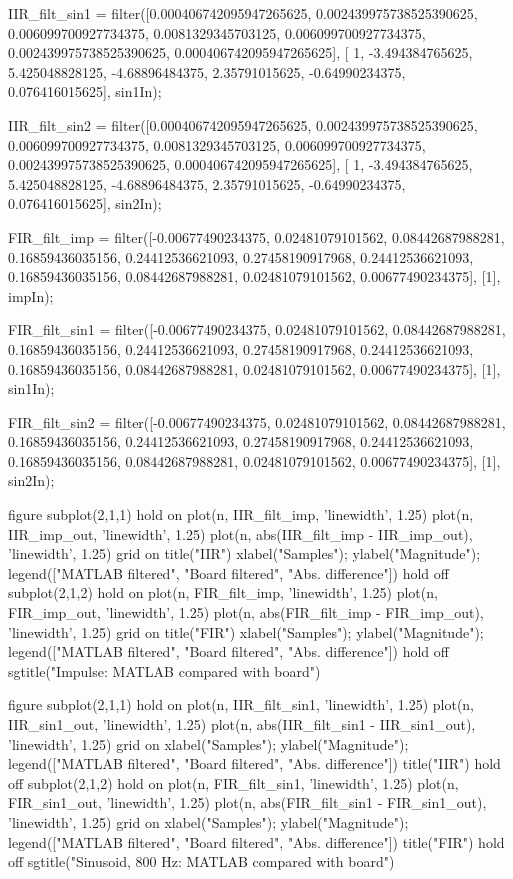 \documentclass{bannerReport}
\begin{document}
\begin{code}
IIR_filt_sin1 = filter([0.000406742095947265625, 0.002439975738525390625,
 0.006099700927734375, 0.0081329345703125, 0.006099700927734375,
  0.002439975738525390625, 0.000406742095947265625],
   [ 1, -3.494384765625, 5.425048828125, -4.68896484375, 2.35791015625,
    -0.64990234375, 0.076416015625], sin1In);

IIR_filt_sin2 = filter([0.000406742095947265625, 0.002439975738525390625,
 0.006099700927734375, 0.0081329345703125, 0.006099700927734375,
  0.002439975738525390625, 0.000406742095947265625], [ 1, -3.494384765625,
   5.425048828125, -4.68896484375, 2.35791015625, -0.64990234375, 0.076416015625],
    sin2In);



FIR_filt_imp = filter([-0.00677490234375, 0.02481079101562, 0.08442687988281,
 0.16859436035156, 0.24412536621093, 0.27458190917968, 0.24412536621093,
 0.16859436035156, 0.08442687988281, 0.02481079101562, 0.00677490234375], [1], impIn);

FIR_filt_sin1 = filter([-0.00677490234375, 0.02481079101562, 0.08442687988281,
 0.16859436035156, 0.24412536621093, 0.27458190917968, 0.24412536621093,
 0.16859436035156, 0.08442687988281, 0.02481079101562, 0.00677490234375], [1],
 sin1In);

FIR_filt_sin2 = filter([-0.00677490234375, 0.02481079101562, 0.08442687988281,
 0.16859436035156, 0.24412536621093, 0.27458190917968, 0.24412536621093,
 0.16859436035156, 0.08442687988281, 0.02481079101562, 0.00677490234375], [1],
 sin2In);

figure
subplot(2,1,1)
hold on
	plot(n, IIR_filt_imp, 'linewidth', 1.25)
	plot(n, IIR_imp_out, 'linewidth', 1.25)
	plot(n, abs(IIR_filt_imp - IIR_imp_out), 'linewidth', 1.25)
	grid on
	title("IIR")
	xlabel("Samples");
	ylabel("Magnitude");
	legend(["MATLAB filtered", "Board filtered", "Abs. difference"])
hold off
subplot(2,1,2)
hold on
	plot(n, FIR_filt_imp, 'linewidth', 1.25)
	plot(n, FIR_imp_out, 'linewidth', 1.25)
	plot(n, abs(FIR_filt_imp - FIR_imp_out), 'linewidth', 1.25)
	grid on
	title("FIR")
	xlabel("Samples");
	ylabel("Magnitude");
	legend(["MATLAB filtered", "Board filtered", "Abs. difference"])
hold off
sgtitle("Impulse: MATLAB compared with board")

figure
subplot(2,1,1)
hold on
	plot(n, IIR_filt_sin1, 'linewidth', 1.25)
	plot(n, IIR_sin1_out, 'linewidth', 1.25)
	plot(n, abs(IIR_filt_sin1 - IIR_sin1_out), 'linewidth', 1.25)
	grid on
	xlabel("Samples");
	ylabel("Magnitude");
	legend(["MATLAB filtered", "Board filtered", "Abs. difference"])
	title("IIR")
hold off
subplot(2,1,2)
hold on
	plot(n, FIR_filt_sin1, 'linewidth', 1.25)
	plot(n, FIR_sin1_out, 'linewidth', 1.25)
	plot(n, abs(FIR_filt_sin1 - FIR_sin1_out), 'linewidth', 1.25)
	grid on
	xlabel("Samples");
	ylabel("Magnitude");
	legend(["MATLAB filtered", "Board filtered", "Abs. difference"])
	title("FIR")
hold off
sgtitle("Sinusoid, 800 Hz: MATLAB compared with board")


\end{code}
\end{document}

